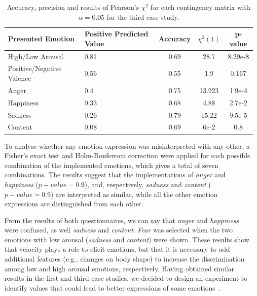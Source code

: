 \begin{table}[h]
	\begin{center}
\small
		\caption{Accuracy, precision and results of Pearson's $\chi^2$ for each contingency matrix with $\alpha = 0.05$ for the third case study.} 
\label{table:Precision}
		\begin{tabular}{|p{3 cm}|p{2 cm}|c|c|c|}
		\hline
		\textbf{Presented Emotion} & \textbf{Positive Predicted Value} & \textbf{Accuracy} & \textbf{$\chi^2(1)$} & \textbf{p-value}\\
		\hline		
		High/Low Arousal & 0.81 & 0.69 & 28.7 & 8.29e-8\\
		\hline
		Positive/Negative Valence & 0.56 & 0.55 & 1.9 & 0.167\\
		\hline
		\hline
		Anger & 0.4 & 0.75&13.923 & 1.9e-4\\
		\hline
		Happiness & 0.33 & 0.68&4.88&2.7e-2\\
		\hline
		Sadness & 0.26 & 0.79&15.22&9.5e-5\\
		\hline
		Content & 0.08 & 0.69&6e-2&0.8 \\		 
		\hline
		\end{tabular}
	\end{center}
\end{table}

To analyse whether any emotion expression was misinterpreted with any other, a Fisher's exact test and Holm-Bonferroni correction were applied for each possible combination of the implemented emotions, which gives a total of seven combinations.  
The results suggest that the implementations of \textit{anger} and \textit{happiness} ($p-value=0.9$), and, respectively, \textit{sadness} and \textit{content} ($p-value=0.9$) are interpreted as similar, while all the other emotion expressions are distinguished from each other. 

From the results of both questionnaires, we can say that \textit{anger} and \textit{happiness} were confused, as well \textit{sadness} and \textit{content}. \textit{Fear} was selected when the two emotions with low arousal (\textit{sadness} and \textit{content}) were shown. These results show that velocity plays a role to elicit emotions, but that it is necessary to add additional features (e.g., changes on body shape) to increase the discrimination among low and high arousal emotions, respectively. Having obtained similar results in the first and third case studies, we decided to design an experiment to identify values that could lead to better expressions of some emotions~\cite{Angel2017}.

